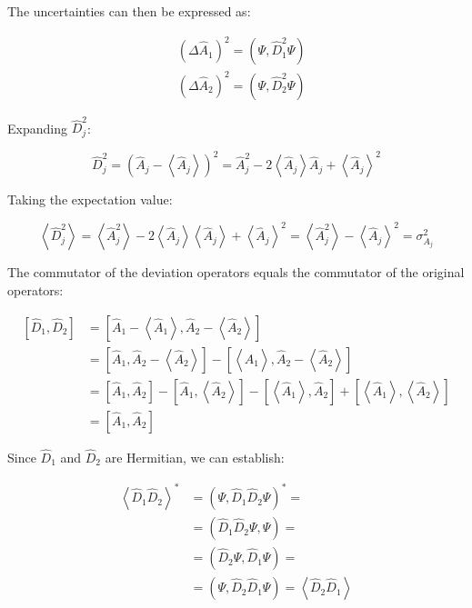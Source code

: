 The uncertainties can then be expressed as:

\begin{align}
& \left(\Delta \hat{A}_{1}\right)^{2}=\left(\Psi, \hat{D}_{1}^{2} \Psi\right) \\
& \left(\Delta \hat{A}_{2}\right)^{2}=\left(\Psi, \hat{D}_{2}^{2} \Psi\right)
\end{align}

Expanding $\hat{D}_j^2$:

\begin{equation}
\hat{D}_{j}^{2}=\left(\hat{A}_{j}-\left\langle\hat{A}_{j}\right\rangle\right)^{2}=\hat{A}_{j}^{2}-2\left\langle\hat{A}_{j}\right\rangle \hat{A}_{j}+\left\langle\hat{A}_{j}\right\rangle^{2}
\end{equation}

Taking the expectation value:

\begin{equation}
\left\langle\hat{D}_{j}^{2}\right\rangle=\left\langle\hat{A}_{j}^{2}\right\rangle-2\left\langle\hat{A}_{j}\right\rangle\left\langle\hat{A}_{j}\right\rangle+\left\langle\hat{A}_{j}\right\rangle^{2}=\left\langle\hat{A}_{j}^{2}\right\rangle-\left\langle\hat{A}_{j}\right\rangle^{2}=\sigma_{A_{j}}^{2}
\end{equation}

The commutator of the deviation operators equals the commutator of the original operators:

\begin{align}
{\left[\hat{D}_{1}, \hat{D}_{2}\right] } & =\left[\hat{A}_{1}-\left\langle\hat{A}_{1}\right\rangle, \hat{A}_{2}-\left\langle\hat{A}_{2}\right\rangle\right] \\
& =\left[\hat{A}_{1}, \hat{A}_{2}-\left\langle\hat{A}_{2}\right\rangle\right]-\left[\left\langle\hat{A}_{1}\right\rangle, \hat{A}_{2}-\left\langle\hat{A}_{2}\right\rangle\right] \\
& =\left[\hat{A}_{1}, \hat{A}_{2}\right]-\left[\hat{A}_{1},\left\langle\hat{A}_{2}\right\rangle\right]-\left[\left\langle\hat{A}_{1}\right\rangle, \hat{A}_{2}\right]+\left[\left\langle\hat{A}_{1}\right\rangle,\left\langle\hat{A}_{2}\right\rangle\right]  \\
& =\left[\hat{A}_{1}, \hat{A}_{2}\right]
\end{align}

Since $\hat{D}_1$ and $\hat{D}_2$ are Hermitian, we can establish:

\begin{align}
\left\langle\hat{D}_{1} \hat{D}_{2}\right\rangle^{*} & =\left(\Psi, \hat{D}_{1} \hat{D}_{2} \Psi\right)^{*}= \\
& =\left(\hat{D}_{1} \hat{D}_{2} \Psi, \Psi\right)=  \\
& =\left(\hat{D}_{2} \Psi, \hat{D}_{1} \Psi\right)= \\
& =\left(\Psi, \hat{D}_{2} \hat{D}_{1} \Psi\right)=\left\langle\hat{D}_{2} \hat{D}_{1}\right\rangle
\end{align}

